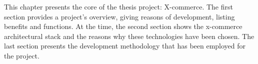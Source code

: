 This chapter presents the core of the thesis project: X-commerce.
The first section provides a project’s overview, giving reasons of development, listing benefits and functions. At the time, the second section shows the x-commerce architectural stack and the reasons why these technologies have been chosen. The last section presents the development methodology that has been employed for the project.